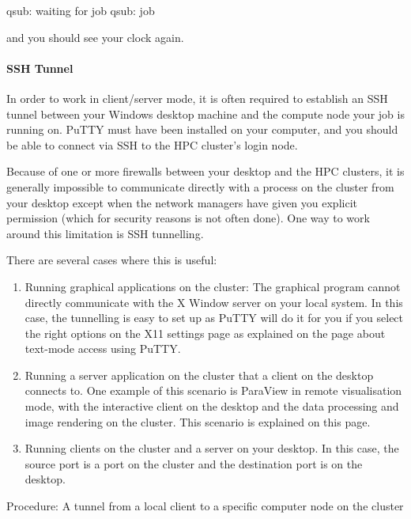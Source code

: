   \begin{prompt}
  qsub: waiting for job %
  qsub: job %
  \end{prompt}

  and you should see your clock again.

  \paragraph{SSH Tunnel}

  In order to work in client/server mode, it is often required to establish an
  SSH tunnel between your Windows desktop machine and the compute node your job
  is running on.  PuTTY must have been installed on your computer, and you should
  be able to connect via SSH to the HPC cluster's login node.

  Because of one or more firewalls between your desktop and the HPC clusters, it
  is generally impossible to communicate directly with a process on the cluster
  from your desktop except when the network managers have given you explicit
  permission (which for security reasons is not often done). One way to work
  around this limitation is SSH tunnelling.

  There are several cases where this is useful:

  \begin{enumerate}
  \item  Running graphical applications on the cluster: The graphical program cannot directly
    communicate with the X Window server on your local system. In this case, the
    tunnelling is easy to set up as PuTTY will do it for you if you select the
    right options on the X11 settings page as explained on the page about
    text-mode access using PuTTY.
  \item  Running a server application on the cluster that a client on the desktop
    connects to. One example of this scenario is ParaView in remote visualisation
    mode, with the interactive client on the desktop and the data processing and
    image rendering on the cluster. This scenario is explained on this page.
  \item  Running clients on the cluster and a server on your desktop. In this
    case, the source port is a port on the cluster and the destination port is on
    the desktop.
  \end{enumerate}

  Procedure: A tunnel from a local client to a specific computer node on the cluster

